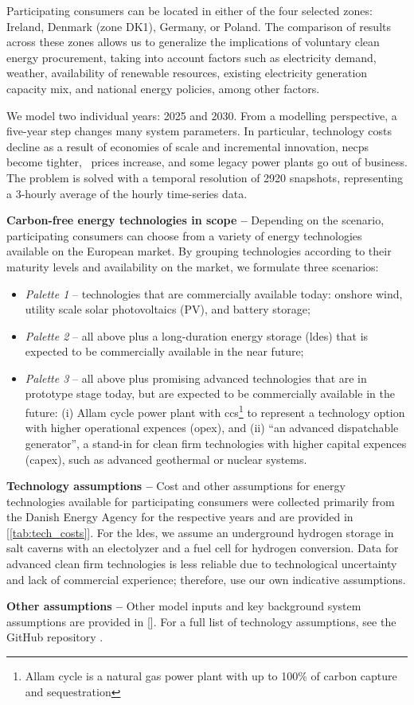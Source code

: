 Participating consumers can be located in either of the four selected zones: Ireland, Denmark (zone DK1), Germany, or Poland.
The comparison of results across these zones allows us to generalize the implications of voluntary clean energy procurement, taking into account factors such as electricity demand, weather, availability of renewable resources, existing electricity generation capacity mix, and national energy policies, among other factors.

We model two individual years: 2025 and 2030.
From a modelling perspective, a five-year step changes many system parameters.
In particular, technology costs decline as a result of economies of scale and incremental innovation, \gls{necp}s become tighter, \co~prices increase, and some legacy power plants go out of business.
The problem is solved with a temporal resolution of 2920 snapshots, representing a 3-hourly average of the hourly time-series data.

\textbf{Carbon-free energy technologies in scope --} Depending on the scenario, participating consumers can choose from a variety of energy technologies available on the European market. By grouping technologies according to their maturity levels and availability on the market, we formulate three scenarios:

\begin{itemize}[-]
    \item \textit{Palette 1} -- technologies that are commercially available today: onshore wind, utility scale solar photovoltaics (\gls{PV}), and battery storage;
    \item \textit{Palette 2} -- all above plus a long-duration energy storage (\gls{ldes}) that is expected to be commercially available in the near future;
    \item \textit{Palette 3} -- all above plus promising advanced technologies that are in prototype stage today, but are expected to be commercially available in the future: (i) Allam cycle power plant with \gls{ccs}\footnote{Allam cycle is a natural gas power plant with up to 100\% of carbon capture and sequestration} to represent a technology option with higher operational expences (\gls{opex}), and (ii) \enquote{an advanced dispatchable generator}, a stand-in for clean firm technologies with higher capital expences (\gls{capex}), such as advanced geothermal or nuclear systems.
\end{itemize}

\textbf{Technology assumptions --} Cost and other assumptions for energy technologies available for participating consumers were collected primarily from the Danish Energy Agency \cite{DEA-technologydata} for the respective years and are provided in [\cref{tab:tech_costs}].
For the \gls{ldes}, we assume an underground hydrogen storage in salt caverns with an electolyzer and a fuel cell for hydrogen conversion.
Data for advanced clean firm technologies is less reliable due to technological uncertainty and lack of commercial experience; therefore, use our own indicative assumptions.

\textbf{Other assumptions --} Other model inputs and key background system assumptions are provided in []. For a full list of technology assumptions, see the GitHub repository \cite{github-247CFEpaper}.